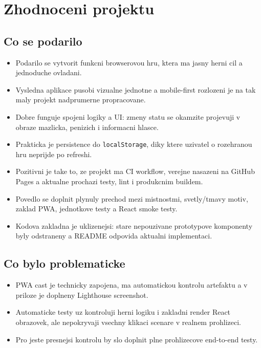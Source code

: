 \documentclass[12pt,a4paper]{article}
\begin{document}
\section{Zhodnoceni projektu}

\subsection*{Co se podarilo}

\begin{itemize}[leftmargin=2em]
  \item Podarilo se vytvorit funkcni browserovou hru, ktera ma jasny herni cil a jednoduche ovladani.
  \item Vysledna aplikace pusobi vizualne jednotne a mobile-first rozlozeni je na tak maly projekt nadprumerne propracovane.
  \item Dobre funguje spojeni logiky a UI: zmeny statu se okamzite projevuji v obraze mazlicka, penizich i informacni hlasce.
  \item Prakticka je persistence do \texttt{localStorage}, diky ktere uzivatel o rozehranou hru neprijde po refreshi.
  \item Pozitivni je take to, ze projekt ma CI workflow, verejne nasazeni na GitHub Pages a aktualne prochazi testy, lint i produkcnim buildem.
  \item Povedlo se doplnit plynuly prechod mezi mistnostmi, svetly/tmavy motiv, zaklad PWA, jednotkove testy a React smoke testy.
  \item Kodova zakladna je uklizenejsi: stare nepouzivane prototypove komponenty byly odstraneny a README odpovida aktualni implementaci.
\end{itemize}

\subsection*{Co bylo problematicke}

\begin{itemize}[leftmargin=2em]
  \item PWA cast je technicky zapojena, ma automatickou kontrolu artefaktu a v priloze je doplneny Lighthouse screenshot.
  \item Automaticke testy uz kontroluji herni logiku i zakladni render React obrazovek, ale nepokryvaji vsechny klikaci scenare v realnem prohlizeci.
  \item Pro jeste presnejsi kontrolu by slo doplnit plne prohlizecove end-to-end testy.
\end{itemize}
\end{document}
